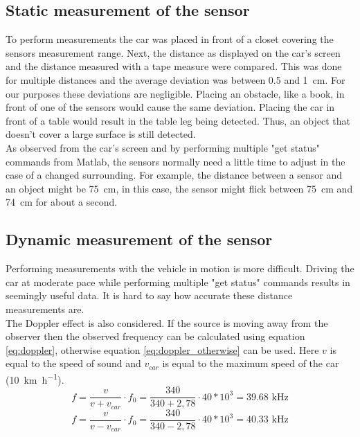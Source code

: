 \documentclass[final]{scrreprt} %
\begin{document}
\subsection{Static measurement of the sensor}

To perform measurements the car was placed in front of a closet covering the sensors measurement range. 
Next, the distance as displayed on the car's screen and the distance measured with a tape measure were compared. 
This was done for multiple distances and the average deviation was between 0.5 and \SI{1}{\centi\metre}. 
For our purposes these deviations are negligible. 
Placing an obstacle, like a book, in front of one of the sensors would cause the same deviation.
Placing the car in front of a table would result in the table leg being detected. 
Thus, an object that doesn't cover a large surface is still detected.\\ 
As observed from the car's screen and by performing multiple "get status" commands from Matlab, the sensors normally need a little time to adjust in the case of a changed surrounding. 
For example, the distance between a sensor and an object might be \SI{75}{\centi\metre}, in this case, the sensor might flick between \SI{75}{\centi\metre} and \SI{74}{\centi\metre} for about a second.


\subsection{Dynamic measurement of the sensor}

Performing measurements with the vehicle in motion is more difficult. Driving the car at moderate pace while performing multiple "get status" commands results in seemingly useful data. 
It is hard to say how accurate these distance measurements are.\\ 
The Doppler effect is also considered. 
If the source is moving away from the observer then the observed frequency can be calculated using equation \ref{eq:doppler}, otherwise equation \ref{eq:doppler_otherwise} can be used. Here $v$ is equal to the speed of sound and $v_{car}$ is equal to the maximum speed of the car (\SI{10}{\kilo\metre\per\hour}).
\begin{equation} 
\label{eq:doppler}
f = \dfrac{v}{v+v_{car}} \cdot f_{0} = \dfrac{340}{340 + 2,78} \cdot {40*10^3} = 39.68 \text{ kHz}
\end{equation}
\begin{equation} 
\label{eq:doppler_otherwise}
f = \dfrac{v}{v-v_{car}} \cdot f_{0} = \dfrac{340}{340 - 2,78} \cdot {40*10^3} = 40.33 \text{ kHz}
\end{equation}
\end{document}
